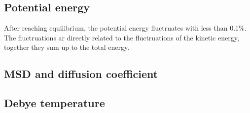 \subsection{Potential energy}
After reaching equilibrium, the potential energy fluctruates with less than 0.1\%. The fluctruations ar directly related to the fluctruations of the kinetic energy, together they sum up to the total energy.

\subsection{MSD and diffusion coefficient}

\subsection{Debye temperature}


